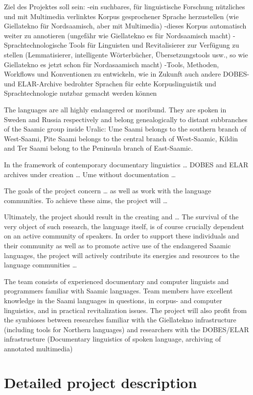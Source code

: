 \documentclass[a4paper,12pt]{article}
\begin{document}
Ziel des Projektes soll sein:
-ein suchbares, für linguistische Forschung nützliches und mit Multimedia verlinktes Korpus gesprochener Sprache herzustellen (wie Giellatekno für Nordsaamisch, aber mit Multimedia)
-dieses Korpus automatisch weiter zu annotieren (ungefähr wie Giellatekno es für Nordsaamisch macht)
-Sprachtechnologische Tools für Linguisten und Revitalisierer zur Verfügung zu stellen (Lemmatisierer, intelligente Wörterbücher, Übersetzungstools usw., so wie Giellatekno es jetzt schon für Nordasaamisch macht)
-Tools, Methoden, Workflows und Konventionen zu entwickeln, wie in Zukunft auch andere DOBES- und ELAR-Archive bedrohter Sprachen für echte Korpuslinguistik und Sprachtechnologie nutzbar gemacht werden können


The languages are all highly endangered or moribund. They are spoken in Sweden and Russia respectively and belong genealogically to distant subbranches of the Saamic group inside Uralic: Ume Saami belongs to the southern branch of West-Saami, Pite Saami belongs to the central branch of West-Saamic, Kildin and Ter Saami belong to the Peninsula branch of East-Saamic.

In the framework of contemporary documentary linguistics … DOBES and ELAR archives under creation … Ume without documentation …

The goals of the project concern … as well as work with the language communities. To achieve these aims, the project will …

Ultimately, the project should result in the creating and … The survival of the very object of such research, the language itself, is of course crucially dependent on an active community of speakers. In order to support these individuals and their community as well as to promote active use of the endangered Saamic languages, the project will actively contribute its energies and resources to the language communities …

The team consists of experienced documentary and computer linguists and programmers familiar with Saamic languages. Team members have excellent knowledge in the Saami languages in questions, in corpus- and computer linguistics, and in practical revitalization issues. The project will also profit from the symbioses between researches familiar with the Giellatekno infrastructure (including tools for Northern languages) and researchers with the DOBES/ELAR infrastructure (Documentary linguistics of spoken language, archiving of annotated multimedia)

\section{Detailed project description}%
\end{document}
